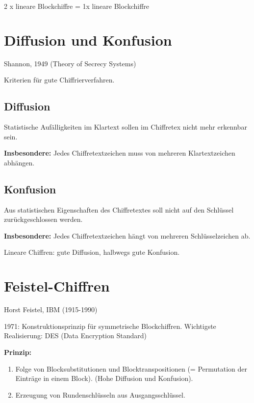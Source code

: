 2 x lineare Blockchiffre = 1x lineare Blockchiffre

\section{Diffusion und Konfusion}

Shannon, 1949 (Theory of Secrecy Systems)

Kriterien für gute Chiffrierverfahren.

\subsection{Diffusion}

Statistische Aufälligkeiten im Klartext sollen im Chiffretex nicht mehr erkennbar sein.

\textbf{Insbesondere:} Jedes Chiffretextzeichen muss von mehreren Klartextzeichen abhängen.

\subsection{Konfusion}

Aus statistischen Eigenschaften des Chiffretextes soll nicht auf den Schlüssel zurückgeschlossen werden.

\textbf{Insbesondere:} Jedes Chiffretextzeichen hängt von mehreren Schlüsselzeichen ab.

\par \medskip


Lineare Chiffren: gute Diffusion, halbwegs gute Konfusion.

\section{Feistel-Chiffren}

Horst Feistel, IBM (1915-1990)

1971: Konstruktionsprinzip für symmetrische Blockchiffren. Wichtigste Realisierung: DES (Data Encryption Standard)

\par \medskip

\textbf{Prinzip:}

\begin{enumerate}
  \item Folge von Blocksubstitutionen und Blocktranspositionen (= Permutation der Einträge in einem Block). (Hohe Diffusion und Konfusion).
  \item Erzeugung von Rundenschlüsseln aus Ausgangsschlüssel.
\end{enumerate}

